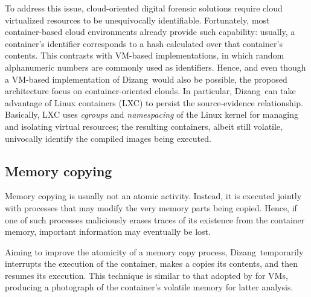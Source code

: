\documentclass[conference]{IEEEtran}
\newcommand{\fancyname}{Dizang}
\begin{document}
To address this issue, cloud-oriented digital forensic solutions require cloud virtualized resources to be unequivocally identifiable.
%
Fortunately, most container-based cloud environments already provide such capability: usually, a container's identifier corresponds to a hash calculated over that container's contents.
%
This contrasts with VM-based implementations, in which random alphanumeric numbers are commonly used as identifiers.
%
Hence, and even though a VM-based implementation of \fancyname\ would also be possible, the proposed architecture focus on container-oriented clouds.
%
In particular, \fancyname\ can take advantage of Linux containers (LXC) to persist the source-evidence relationship.
%
Basically, LXC uses \textit{cgroups} and \textit{namespacing} of the Linux kernel for managing and isolating virtual resources; the resulting containers, albeit still volatile, univocally identify the compiled images being executed.
%
%

\subsection{Memory copying}
\label{sec:proposal-desc-memcpy}

Memory copying is usually not an atomic activity.
%
Instead, it is executed jointly with processes that may modify the very memory parts being copied.
%
Hence, if one of such processes maliciously erases traces of its existence from the container memory, important information may eventually be lost.


Aiming to improve the atomicity of a memory copy process, \fancyname\ temporarily interrupts the execution of the container, makes a copies its contents, and then resumes its execution. 
%
This technique is similar to that adopted by \cite{Rafique_Static_Live_Digital_Forensics:2013} for VMs, producing a photograph of the container's volatile memory for latter analysis.
\end{document}
